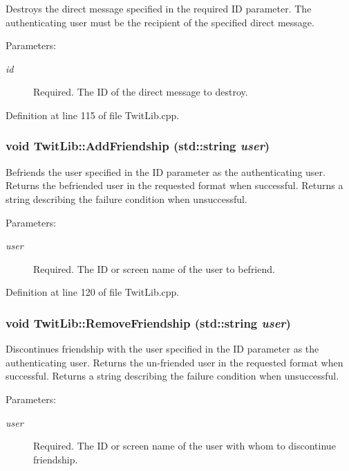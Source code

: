 Destroys the direct message specified in the required ID parameter. The authenticating user must be the recipient of the specified direct message. \begin{Desc}
\item[Parameters:]
\begin{description}
\item[{\em id}]Required. The ID of the direct message to destroy. \end{description}
\end{Desc}


Definition at line 115 of file TwitLib.cpp.\hypertarget{classTwitLib_0ce624472fe8b48f7cfbf0a5740b722a}{
\subsubsection{\setlength{\rightskip}{0pt plus 5cm}void TwitLib::AddFriendship (std::string {\em user})}}
\label{classTwitLib_0ce624472fe8b48f7cfbf0a5740b722a}


Befriends the user specified in the ID parameter as the authenticating user. Returns the befriended user in the requested format when successful. Returns a string describing the failure condition when unsuccessful. \begin{Desc}
\item[Parameters:]
\begin{description}
\item[{\em user}]Required. The ID or screen name of the user to befriend. \end{description}
\end{Desc}


Definition at line 120 of file TwitLib.cpp.\hypertarget{classTwitLib_28e61df6e7bf8614ba93ab612a72d7d9}{
\subsubsection{\setlength{\rightskip}{0pt plus 5cm}void TwitLib::RemoveFriendship (std::string {\em user})}}
\label{classTwitLib_28e61df6e7bf8614ba93ab612a72d7d9}


Discontinues friendship with the user specified in the ID parameter as the authenticating user. Returns the un-friended user in the requested format when successful. Returns a string describing the failure condition when unsuccessful. \begin{Desc}
\item[Parameters:]
\begin{description}
\item[{\em user}]Required. The ID or screen name of the user with whom to discontinue friendship. \end{description}
\end{Desc}


